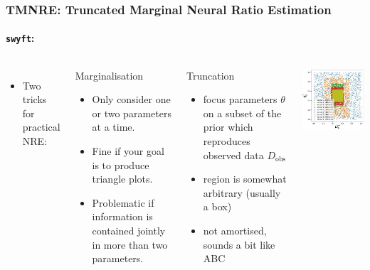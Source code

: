 \documentclass[aspectratio=169]{beamer}
\begin{document}
\begin{frame}
    \frametitle{TMNRE: Truncated Marginal Neural Ratio Estimation}
    \framesubtitle{\texttt{swyft}: }
    \begin{columns}
        \begin{itemize}
            \item Two tricks for practical NRE:
        \end{itemize}
        \begin{block}{Marginalisation}
            \begin{itemize}
                \item Only consider one or two parameters at a time.
                \item Fine if your goal is to produce triangle plots.
                \item Problematic if information is contained jointly in more than two parameters.
            \end{itemize}
        \end{block}
        \begin{block}{Truncation}
            \begin{itemize}
                \item focus parameters $\theta$ on a subset of the prior which reproduces observed data $D_\text{obs}$
                \item region is somewhat arbitrary (usually a box)
                \item not amortised, sounds a bit like ABC
            \end{itemize}
        \end{block}
        \includegraphics[width=\textwidth]{figures/tmnre}
    \end{columns}
\end{frame}
\end{document}
